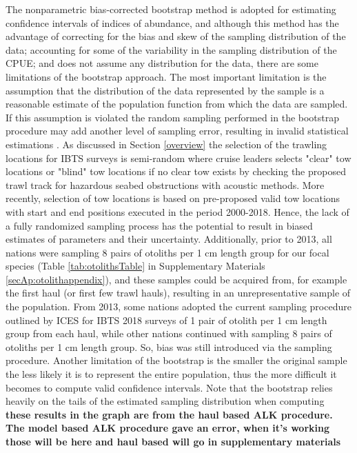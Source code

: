 \documentclass[a4paper 12pt]{article}
\numberwithin{equation}{section}
\begin{document}
The nonparametric bias-corrected bootstrap method is adopted for estimating confidence intervals of indices of abundance, and although this method has the advantage of correcting for the bias and skew of the sampling distribution of the data; accounting for some of the variability in the sampling distribution of the CPUE;  and does not assume any distribution for the data, there are some limitations of the bootstrap approach. The most important limitation is the assumption that the distribution of the data represented by the sample is a reasonable estimate of the population function from which the data are sampled. If this assumption is violated the random sampling  performed in the bootstrap procedure may add another level of sampling error, resulting in invalid statistical estimations \citep{haukoos2005advanced}. As discussed in Section \ref{overview} the selection of the trawling locations for IBTS surveys is semi-random where cruise leaders selects "clear" tow locations or "blind" tow locations if no clear tow exists by checking the proposed trawl track for hazardous seabed obstructions with acoustic methods. More recently, selection of tow locations is based on pre-proposed valid tow locations with start and end positions executed in the period 2000-2018. Hence, the lack of a fully randomized sampling process has the potential to result in biased estimates of parameters and their uncertainty. Additionally, prior to 2013, all nations were sampling 8 pairs of otoliths per 1 cm length group for our focal species (Table \ref{tab:otolithsTable} in Supplementary Materials \ref{secAp:otolithappendix}), and these samples could be acquired from, for example the first haul (or first few trawl hauls), resulting in an unrepresentative sample of the population. From 2013, some nations adopted the current sampling procedure outlined by ICES for IBTS 2018 surveys of 1 pair of otolith per 1 cm length group from each haul, while other nations continued with sampling 8 pairs of otoliths per 1 cm length group. So, bias was still introduced via the sampling  procedure. Another limitation of the bootstrap is the smaller the original sample the less likely it is to represent the entire population, thus the more difficult it becomes to compute valid confidence intervals. Note that the bootstrap relies heavily on the tails of the estimated sampling distribution when computing \\

{\bf these results in the graph are from the haul based ALK procedure. The model based ALK procedure gave an error, when it's working those will be here and haul based will go in supplementary materials} 
\end{document}
